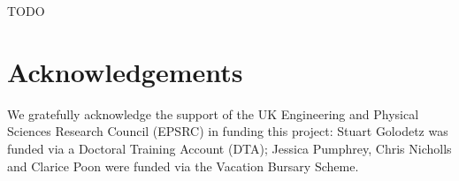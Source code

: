 \documentclass[preprint,a4paper]{elsarticle}
\begin{document}
TODO

\section{Acknowledgements}
\label{sec:acknowledgements}

We gratefully acknowledge the support of the UK Engineering and Physical Sciences Research Council (EPSRC) in funding this project: Stuart Golodetz was funded via a Doctoral Training Account (DTA); Jessica Pumphrey, Chris Nicholls and Clarice Poon were funded via the Vacation Bursary Scheme.



\end{document}
